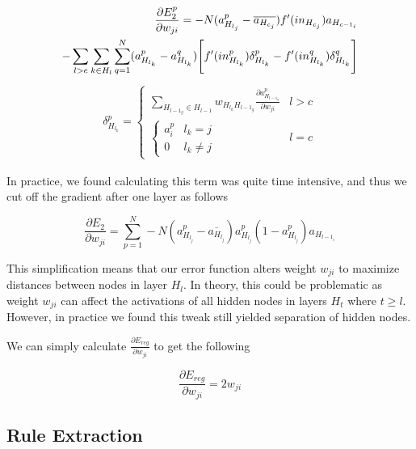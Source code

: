 \begin{align}
    \frac{\partial E_2^p}{\partial w_{ji}} =
    -N(a_{H_{l_j}}^p - \overline{a_{H_{c_j}}})f'(in_{H_{c_j}})a_{H_{c-1_i}} \notag\\
    -\sum_{l>c}\sum_{k\in H_{l}}\sum_{q=1}^N (a_{H_{l_k}}^p - a_{H_{l_k}}^q)  \Bigg[f'(in_{H_{l_k}}^p)\delta_{H_{l_k}}^p - f'(in_{H_{l_k}}^q)\delta_{H_{l_k}}^q  \Bigg]
\end{align}
\begin{align}
    \delta_{H_{l_k}}^p = 
     \begin{cases}
         \sum_{H_{l-1_{g}}\in H_{l-1}} w_{H_{l_k}H_{l-1_{g}}} \frac{\partial a_{H_{l-1_{g}}}^p}{\partial w_{ji}} & l > c \\
         \begin{cases}
            a_i^p & l_k = j \\
            0 & l_k \neq j
         \end{cases} & l = c
    \end{cases} 
\end{align}

In practice, we found calculating this term was quite time intensive, and thus
we cut off the gradient after one layer as follows

\begin{equation}
  \frac{\partial E_2}{\partial w_{ji}} = \sum_{p=1}^{N} -N(a_{H_{l_j}}^p - \overline{a_{H_{l_j}}})a_{H_{l_j}}^p(1-a_{H_{l_j}}^p)a_{H_{l-1_i}}
\end{equation}

This simplification means that our error function alters weight
$w_{ji}$ to maximize distances between nodes in layer $H_{l}$. In theory, this
could be problematic as weight $w_{ji}$ can affect the activations of all
hidden nodes in layers $H_{t}$ where $t \geq l$. However, in practice we
found this tweak still yielded separation of hidden nodes.

We can simply calculate $\frac{\partial E_{reg}}{\partial w_{ji}}$ to get the following

\begin{equation}
  \frac{\partial E_{reg}}{\partial w_{ji}} = 2 w_{ji}
\end{equation}

\subsection{Rule Extraction}
\label{sec:re}

